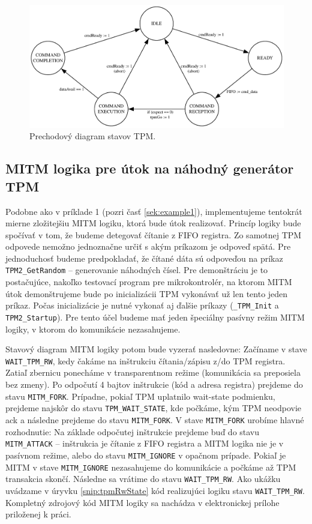 \begin{figure}
    \centerline{\includegraphics[width=1\textwidth]{images/misc/tpmStateTransition.pdf}}
    \caption[Prechodový diagram stavov TPM]{Prechodový diagram stavov TPM.}
    \label{obr:tpmStateTransition}
\end{figure}

\subsection{MITM logika pre útok na náhodný generátor TPM}
Podobne ako v príklade 1 (pozri časť \ref{sek:example1}), implementujeme tentokrát mierne zložitejšiu MITM logiku, ktorá bude útok realizovať. Princíp logiky bude spočívať v tom, že budeme detegovať čítanie z FIFO registra. Zo samotnej TPM odpovede nemožno jednoznačne určiť s akým príkazom je odpoveď spätá. Pre jednoduchosť budeme predpokladať, že čítané dáta sú odpoveďou na príkaz \texttt{TPM2\_GetRandom} -- generovanie náhodných čísel. Pre demonštráciu je to postačujúce, nakoľko testovací program pre mikrokontrolér, na ktorom MITM útok demonštrujeme bude po inicializácii TPM vykonávať už len tento jeden príkaz. Počas inicializácie je nutné vykonať aj ďalšie príkazy (\texttt{\_TPM\_Init} a \texttt{TPM2\_Startup}). Pre tento účel budeme mať jeden špeciálny pasívny režim MITM logiky, v ktorom do komunikácie nezasahujeme.

Stavový diagram MITM logiky potom bude vyzerať nasledovne: Začíname v stave \texttt{WAIT\_TPM\_RW}, kedy čakáme na inštrukciu čítania/zápisu z/do TPM registra. Zatiaľ zbernicu ponecháme v transparentnom režime (komunikácia sa preposiela bez zmeny). Po odpočutí 4 bajtov inštrukcie (kód a adresa registra) prejdeme do stavu \texttt{MITM\_FORK}. Prípadne, pokiaľ TPM uplatnilo wait-state podmienku, prejdeme najskôr do stavu \texttt{TPM\_WAIT\_STATE}, kde počkáme, kým TPM neodpovie ack a následne prejdeme do stavu \texttt{MITM\_FORK}. V stave \texttt{MITM\_FORK} urobíme hlavné rozhodnutie: Na základe odpočutej inštrukcie prejdeme buď do stavu \texttt{MITM\_ATTACK} -- inštrukcia je čítanie z FIFO registra a MITM logika nie je v pasívnom režime, alebo do stavu \texttt{MITM\_IGNORE} v opačnom prípade. Pokiaľ je MITM v stave \texttt{MITM\_IGNORE} nezasahujeme do komunikácie a počkáme až TPM transakcia skončí. Následne sa vrátime do stavu \texttt{WAIT\_TPM\_RW}. Ako ukážku uvádzame v úryvku \ref{snip:tpmRwState} kód realizujúci logiku stavu \texttt{WAIT\_TPM\_RW}. Kompletný zdrojový kód MITM logiky sa nachádza v elektronickej prílohe priloženej k práci.


